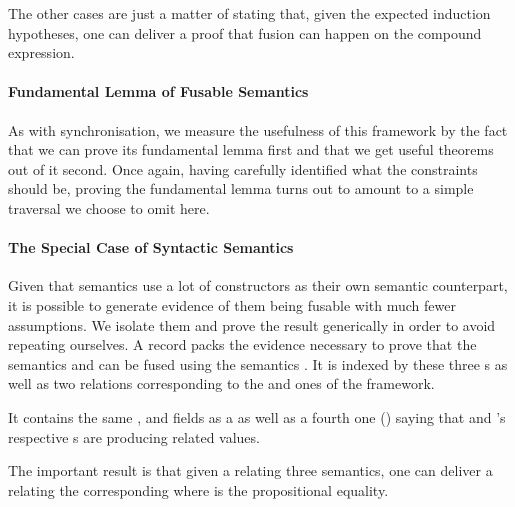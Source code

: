 
The other cases are just a matter of stating that, given the
expected induction hypotheses, one can deliver a proof that
fusion can happen on the compound expression.

\paragraph{Fundamental Lemma of Fusable Semantics}

As with synchronisation, we measure the usefulness of this framework
by the fact that we can prove its fundamental lemma first and that
we get useful theorems out of it second. Once again, having carefully
identified what the constraints should be, proving the fundamental
lemma turns out to amount to a simple traversal we choose to omit here.


\paragraph{The Special Case of Syntactic Semantics}

Given that  semantics use a lot of constructors
as their own semantic counterpart, it is possible to generate
evidence of them being fusable with much fewer assumptions.
We isolate them and prove the result generically in order to
avoid repeating ourselves.
A  record packs the evidence necessary to
prove that the  semantics  and 
can be fused using the  semantics . It
is indexed by these three s as well as two relations
corresponding to the  and  ones of the
 framework.

It contains the same ,  and 
fields as a  as well as a fourth one ()
saying that  and 's respective s are
producing related values.


The important result is that given a  relating
three  semantics, one can deliver a  relating
the corresponding  where  is the propositional
equality.

